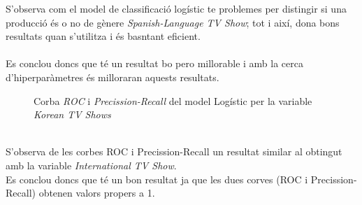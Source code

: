 \documentclass[a4paper, 11pt]{article}
\begin{document}
S'observa com el model de classificació logístic te problemes per distingir si una producció és o no de gènere \textit{Spanish-Language TV Show}; tot i així, dona bons resultats quan s'utilitza i és basntant eficient.\\\\
Es conclou doncs que té un resultat bo pero millorable i amb la cerca d'hiperparàmetres és milloraran aquests resultats.
\newpage 
\begin{figure}[h]
\centering
    \caption{Corba \textit{ROC} i \textit{Precission-Recall} del model Logístic per la variable \textit{Korean TV Shows}}
    \label{fig:my_label}
\end{figure}\\
\hspace{-1.5em}S'observa de les corbes ROC i Precission-Recall un resultat similar al obtingut amb la variable \textit{International TV Show}.\\
Es conclou doncs que té un bon resultat ja que les dues corves (ROC i Precission-Recall) obtenen valors propers a 1.
\end{document}
